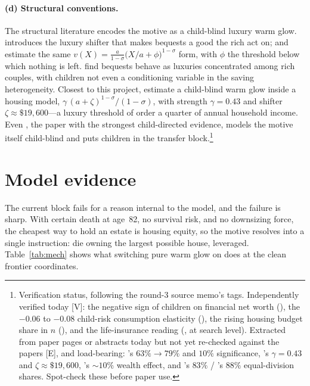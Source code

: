 \documentclass[10pt]{article}
\begin{document}
\paragraph{(d) Structural conventions.} The structural literature encodes the
motive as a child-blind luxury warm glow. \citet{denardi2004} introduces the
luxury shifter that makes bequests a good the rich act on;
\citet{lockwood2018} and \citet{ameriks2011} estimate the same
$v(X)=\frac{a}{1-\sigma}\big(X/a+\phi\big)^{1-\sigma}$ form, with $\phi$ the
threshold below which nothing is left. \citet{denardi2025} find bequests
behave as luxuries concentrated among rich couples, with children not even a
conditioning variable in the saving heterogeneity. Closest to this project,
\citet{nakajima2017} estimate a child-blind warm glow inside a housing model,
$\gamma\,(a+\zeta)^{1-\sigma}/(1-\sigma)$, with strength $\gamma=0.43$ and
shifter $\zeta\approx\$19{,}600$---a luxury threshold of order a quarter of
annual household income. Even \citet{kvaerner2023}, the paper with the
strongest child-directed evidence, models the motive itself child-blind and
puts children in the transfer block.\footnote{Verification status, following
the round-3 source memo's tags. Independently verified today [V]: the negative
sign of children on financial net worth (\citeauthor{scholzseshadri}), the
$-0.06$ to $-0.08$ child-risk consumption elasticity (\citeauthor{boar2021}),
the rising housing budget share in $n$ (\citeauthor{coeurdacier2023}), and the
life-insurance reading (\citeauthor{bernheim1991}, at search level).
Extracted from paper pages or abstracts today but not yet re-checked against
the papers [E], and load-bearing: \citeauthor{kopczuk2007}'s $63\%\!\to\!79\%$
and $10\%$ significance, \citeauthor{nakajima2017}'s $\gamma=0.43$ and
$\zeta\approx\$19{,}600$, \citeauthor{kvaerner2023}'s $\sim\!10\%$ wealth
effect, and \citeauthor{mcgarry1999}'s $83\%$ / \citeauthor{wilhelm1996}'s
$88\%$ equal-division shares. Spot-check these before paper use.}

\section{Model evidence}

The current block fails for a reason internal to the model, and the failure is
sharp. With certain death at age~82, no survival risk, and no downsizing
force, the cheapest way to hold an estate is housing equity, so the motive
resolves into a single instruction: die owning the largest possible house,
leveraged. Table~\ref{tab:mech} shows what switching pure warm glow on does at
the clean frontier coordinates.
\end{document}
